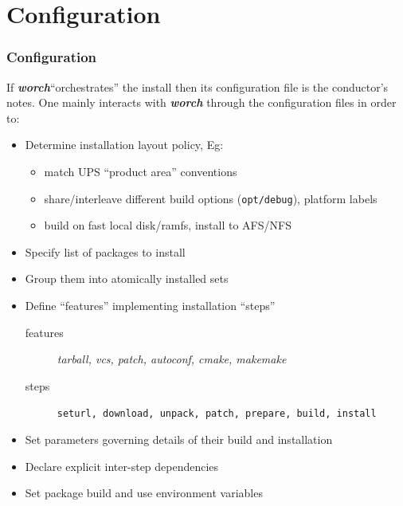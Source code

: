 \documentclass[xcolor=dvipsnames]{beamer}
\newcommand{\app}[1]{\textbf{\textit{#1}}\xspace}
\def\worch{\app{worch}}
\begin{document}
\section{Configuration}

\begin{frame}
\tableofcontents[
currentsection,currentsubsection,
hideothersubsections,sectionstyle=show/shaded,
] 
\end{frame}

\begin{frame}
  \frametitle{Configuration} 

  If \worch ``orchestrates'' the install then its configuration file
  is the conductor's notes.  One mainly interacts with \worch through
  the configuration files in order to:
  \begin{itemize}
  \item Determine installation layout policy, Eg:
    \begin{itemize}
    \item match UPS ``product area'' conventions
    \item share/interleave different build options (\texttt{opt/debug}), platform labels
    \item build on fast local disk/ramfs, install to AFS/NFS
    \end{itemize}
  \item Specify list of packages to install
  \item Group them into atomically installed sets
  \item Define ``features'' implementing installation ``steps''
    \begin{description}
    \item [features] \textit{tarball, vcs, patch, autoconf, cmake, makemake}
    \item [steps] \texttt{seturl, download, unpack, patch, prepare, build, install}
    \end{description}
  \item Set parameters governing details of their build and installation
  \item Declare explicit inter-step dependencies
  \item Set package build and use environment variables
  \end{itemize}
\end{frame}
\end{document}
